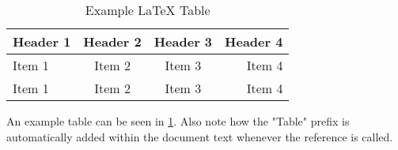 \begin{table}[H]
   \caption{Example LaTeX Table} 
   \label{tab:example}
   \small
   \centering
   \begin{tabular}{lccr}
   \toprule\toprule
   \textbf{Header 1} & \textbf{Header 2} & \textbf{Header 3} & \textbf{Header 4} \\ 
   \midrule
   Item 1 & Item 2 & Item 3 & Item 4 \\
   Item 1 & Item 2 & Item 3 & Item 4\\
   \bottomrule
   \end{tabular}
\end{table}

An example table can be seen in \ref{tab:example}.
Also note how the "Table" prefix is automatically added within the document text whenever the reference is called.